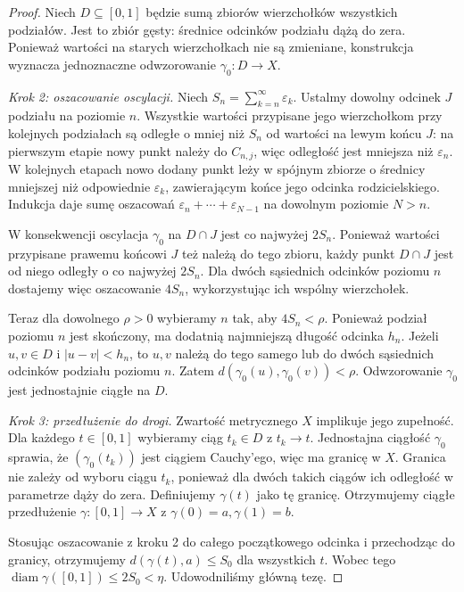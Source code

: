 \begin{proof}
Niech \(D\subseteq[0,1]\) będzie
sumą zbiorów wierzchołków
wszystkich podziałów.
Jest to zbiór gęsty:
średnice odcinków podziału dążą do zera.
Ponieważ wartości na starych wierzchołkach
nie są zmieniane, konstrukcja
wyznacza jednoznaczne odwzorowanie
\(\gamma_0\colon D\to X\).

\emph{Krok 2: oszacowanie oscylacji.}
Niech
\(S_n=\sum_{k=n}^{\infty}\varepsilon_k\).
Ustalmy dowolny odcinek \(J\)
podziału na poziomie \(n\).
Wszystkie wartości przypisane
jego wierzchołkom przy kolejnych
podziałach są odległe o mniej
niż \(S_n\) od wartości
na lewym końcu \(J\):
na pierwszym etapie nowy punkt
należy do \(C_{n,j}\),
więc odległość jest mniejsza
niż \(\varepsilon_n\).
W kolejnych etapach
nowo dodany punkt leży w
spójnym zbiorze o średnicy
mniejszej niż odpowiednie
\(\varepsilon_k\), zawierającym
końce jego odcinka rodzicielskiego.
Indukcja daje sumę oszacowań
\(\varepsilon_n+\cdots+\varepsilon_{N-1}\)
na dowolnym poziomie \(N>n\).

W konsekwencji oscylacja \(\gamma_0\)
na \(D\cap J\) jest co najwyżej \(2S_n\).
Ponieważ wartości przypisane
prawemu końcowi \(J\)
też należą do tego zbioru,
każdy punkt \(D\cap J\)
jest od niego odległy
o co najwyżej \(2S_n\).
Dla dwóch sąsiednich odcinków
poziomu \(n\) dostajemy więc
oszacowanie \(4S_n\),
wykorzystując ich wspólny wierzchołek.

Teraz dla dowolnego \(\rho>0\)
wybieramy \(n\) tak, aby \(4S_n<\rho\).
Ponieważ podział poziomu \(n\)
jest skończony, ma dodatnią
najmniejszą długość odcinka \(h_n\).
Jeżeli \(u,v\in D\) i
\(|u-v|<h_n\), to \(u,v\)
należą do tego samego lub
do dwóch sąsiednich odcinków
podziału poziomu \(n\).
Zatem \(d(\gamma_0(u),\gamma_0(v))<\rho\).
Odwzorowanie \(\gamma_0\)
jest jednostajnie ciągłe na \(D\).

\emph{Krok 3: przedłużenie do drogi.}
Zwartość metrycznego \(X\)
implikuje jego zupełność.
Dla każdego \(t\in[0,1]\)
wybieramy ciąg \(t_k\in D\)
z \(t_k\to t\).
Jednostajna ciągłość \(\gamma_0\)
sprawia, że \((\gamma_0(t_k))\)
jest ciągiem Cauchy'ego,
więc ma granicę w \(X\).
Granica nie zależy od wyboru
ciągu \(t_k\), ponieważ dla
dwóch takich ciągów
ich odległość w parametrze
dąży do zera.
Definiujemy \(\gamma(t)\)
jako tę granicę.
Otrzymujemy ciągłe przedłużenie
\(\gamma\colon[0,1]\to X\)
z \(\gamma(0)=a,\gamma(1)=b\).

Stosując oszacowanie z kroku 2
do całego początkowego odcinka
i przechodząc do granicy,
otrzymujemy
\(d(\gamma(t),a)\le S_0\)
dla wszystkich \(t\).
Wobec tego
\(\operatorname{diam}\gamma([0,1])
\le2S_0<\eta\).
Udowodniliśmy główną tezę.


\end{proof}

